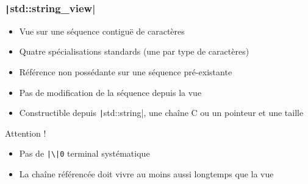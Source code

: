 \documentclass[C++.tex]{subfiles}
\begin{document}
\begin{frame}[fragile]
	\frametitle{\texttt|std::string_view|}
	\begin{itemize}
		\item Vue sur une séquence contiguë de caractères
		\item Quatre spécialisations standards (une par type de caractères)
		\item Référence non possédante sur une séquence pré-existante
		\item Pas de modification de la séquence depuis la vue
		\item Constructible depuis \texttt|std::string|, une chaîne C ou un pointeur et une taille
	\end{itemize}

	\begin{alertblock}{Attention !}
		\begin{itemize}
			\item Pas de \texttt{|\textbackslash|0} terminal systématique
			\item La chaîne référencée doit vivre au moins aussi longtemps que la vue
		\end{itemize}
	\end{alertblock}
\end{frame}
\end{document}
